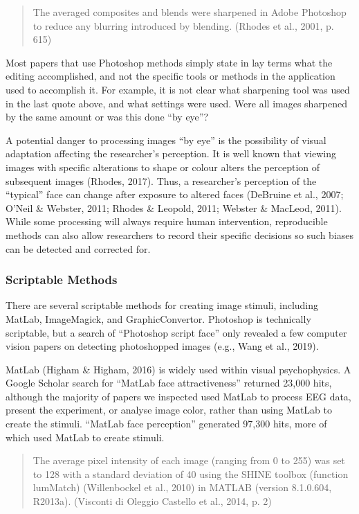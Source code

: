 \documentclass[
  doc,floatsintext]{apa6}
\begin{document}
\begin{quote}
The averaged composites and blends were sharpened in Adobe Photoshop to reduce any blurring introduced by blending. (Rhodes et al., 2001, p. 615)
\end{quote}

Most papers that use Photoshop methods simply state in lay terms what the editing accomplished, and not the specific tools or methods in the application used to accomplish it. For example, it is not clear what sharpening tool was used in the last quote above, and what settings were used. Were all images sharpened by the same amount or was this done ``by eye''?

A potential danger to processing images ``by eye'' is the possibility of visual adaptation affecting the researcher's perception. It is well known that viewing images with specific alterations to shape or colour alters the perception of subsequent images (Rhodes, 2017). Thus, a researcher's perception of the ``typical'' face can change after exposure to altered faces (DeBruine et al., 2007; O'Neil \& Webster, 2011; Rhodes \& Leopold, 2011; Webster \& MacLeod, 2011). While some processing will always require human intervention, reproducible methods can also allow researchers to record their specific decisions so such biases can be detected and corrected for.

\hypertarget{scriptable-methods}{%
\subsubsection{Scriptable Methods}\label{scriptable-methods}}

There are several scriptable methods for creating image stimuli, including MatLab, ImageMagick, and GraphicConvertor. Photoshop is technically scriptable, but a search of ``Photoshop script face'' only revealed a few computer vision papers on detecting photoshopped images (e.g., Wang et al., 2019).

MatLab (Higham \& Higham, 2016) is widely used within visual psychophysics. A Google Scholar search for ``MatLab face attractiveness'' returned 23,000 hits, although the majority of papers we inspected used MatLab to process EEG data, present the experiment, or analyse image color, rather than using MatLab to create the stimuli. ``MatLab face perception'' generated 97,300 hits, more of which used MatLab to create stimuli.

\begin{quote}
The average pixel intensity of each image (ranging from 0 to 255) was set to 128 with a standard deviation of 40 using the SHINE toolbox (function lumMatch) (Willenbockel et al., 2010) in MATLAB (version 8.1.0.604, R2013a). (Visconti di Oleggio Castello et al., 2014, p. 2)
\end{quote}
\end{document}
